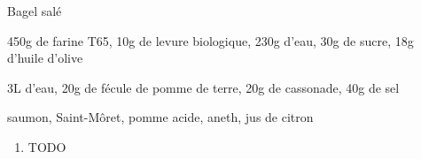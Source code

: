 \begin{recette}{Bagel salé}
	\begin{ingredients}
			450g de farine T65\sep
			10g de levure biologique\sep
			230g d'eau\sep
			30g de sucre\sep
			18g d'huile d'olive
	\end{ingredients}
	\begin{ingredients}
			3L d'eau\sep
			20g de fécule de pomme de terre\sep
			20g de cassonade\sep
			40g de sel
	\end{ingredients}
	\begin{ingredients}
			saumon\sep
			Saint-Môret\sep
			pomme acide\sep
			aneth\sep
			jus de citron
	\end{ingredients}
	
	\begin{enumerate}
		\item TODO
	\end{enumerate}
\end{recette}